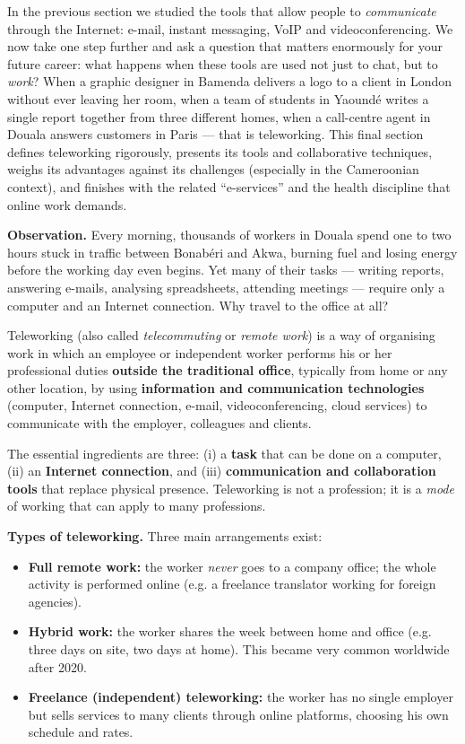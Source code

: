 \documentclass[11pt]{article}
\newcommand{\cle}[1]{{\popxbold\color{popdark}#1}}
\newcounter{popsec}
\newcounter{popsub}
\newcommand{\courssub}[1]{%
  \stepcounter{popsub}%
  \par\vspace{9pt}\noindent{\popxbold\fontsize{11.5}{13}\selectfont\color{popink}{\color{poporange}\thepopsec.\thepopsub}\hspace{6pt}#1}\par\nopagebreak\vspace{4pt}
}
\begin{document}
In the previous section we studied the tools that allow people to \emph{communicate} through the Internet: e-mail, instant messaging, VoIP and videoconferencing. We now take one step further and ask a question that matters enormously for your future career: what happens when these tools are used not just to chat, but to \emph{work}? When a graphic designer in Bamenda delivers a logo to a client in London without ever leaving her room, when a team of students in Yaoundé writes a single report together from three different homes, when a call-centre agent in Douala answers customers in Paris — that is \cle{teleworking}. This final section defines teleworking rigorously, presents its tools and collaborative techniques, weighs its advantages against its challenges (especially in the Cameroonian context), and finishes with the related ``e-services'' and the health discipline that online work demands.

\courssub{What is Teleworking?}

\textbf{Observation.} Every morning, thousands of workers in Douala spend one to two hours stuck in traffic between Bonabéri and Akwa, burning fuel and losing energy before the working day even begins. Yet many of their tasks — writing reports, answering e-mails, analysing spreadsheets, attending meetings — require only a computer and an Internet connection. Why travel to the office at all?

\begin{definition}[Teleworking]
\cle{Teleworking} (also called \emph{telecommuting} or \emph{remote work}) is a way of organising work in which an employee or independent worker performs his or her professional duties \textbf{outside the traditional office}, typically from home or any other location, by using \textbf{information and communication technologies} (computer, Internet connection, e-mail, videoconferencing, cloud services) to communicate with the employer, colleagues and clients.
\end{definition}

The essential ingredients are three: (i) a \textbf{task} that can be done on a computer, (ii) an \textbf{Internet connection}, and (iii) \textbf{communication and collaboration tools} that replace physical presence. Teleworking is not a profession; it is a \emph{mode} of working that can apply to many professions.

\textbf{Types of teleworking.} Three main arrangements exist:

\begin{itemize}
\item \textbf{Full remote work:} the worker \emph{never} goes to a company office; the whole activity is performed online (e.g. a freelance translator working for foreign agencies).
\item \textbf{Hybrid work:} the worker shares the week between home and office (e.g. three days on site, two days at home). This became very common worldwide after 2020.
\item \textbf{Freelance (independent) teleworking:} the worker has no single employer but sells services to many clients through online platforms, choosing his own schedule and rates.
\end{itemize}
\end{document}

